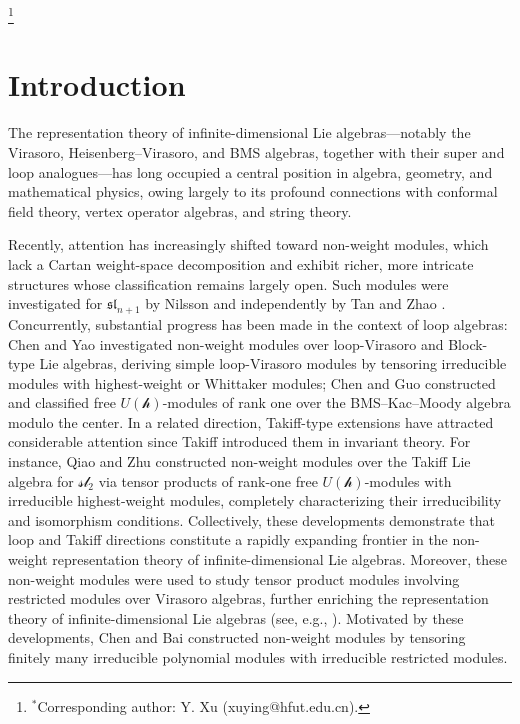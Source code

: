 \documentclass[12pt,reqno]{amsart}
\numberwithin{equation}{section}
\begin{document}
 

\footnote {
$^*$Corresponding author: Y. Xu (xuying@hfut.edu.cn).
}
\maketitle
\vspace{-10mm}


\tableofcontents
\section{Introduction}
The representation theory of infinite-dimensional Lie algebras---notably the Virasoro, Heisenberg--Virasoro, and BMS algebras, together with their super and loop analogues---has long occupied a central position in algebra, geometry, and mathematical physics, owing largely to its profound connections with conformal field theory, vertex operator algebras, and string theory. 

  
Recently, attention has increasingly shifted toward non-weight modules,
 which lack a Cartan weight-space decomposition and exhibit richer, more intricate structures whose classification remains largely open. 
 Such modules were investigated for \(\mathfrak{sl}_{n+1}\) by Nilsson \cite{N1} and independently by Tan and Zhao \cite{TZ1}. Concurrently, substantial progress has been made in the context of loop algebras: Chen and Yao \cite{CY} investigated non-weight modules over loop-Virasoro and Block-type Lie algebras, deriving simple loop-Virasoro modules by tensoring irreducible modules with highest-weight or Whittaker modules; Chen and Guo \cite{CG1} constructed and classified  free \(U(\mathcal{h})\)-modules of rank one over the BMS--Kac--Moody algebra modulo the center.
 In a related direction, Takiff-type extensions have attracted considerable attention since Takiff \cite{T} introduced them in invariant theory. For instance, Qiao and Zhu \cite{QZ} constructed non-weight modules over the Takiff Lie algebra for \(\mathcal{sl}_2\) via tensor products of rank-one free \(U(\mathcal{h})\)-modules with irreducible highest-weight modules, completely characterizing their irreducibility and isomorphism conditions. Collectively, these developments demonstrate that loop and Takiff directions constitute a rapidly expanding frontier in the non-weight representation theory of infinite-dimensional Lie algebras. Moreover, these non-weight modules were used to study tensor product modules involving restricted modules over  Virasoro algebras, further enriching the representation theory of infinite-dimensional Lie algebras (see, e.g., \cite{MZ,TZ2,TZ3}). Motivated by these developments, Chen and Bai \cite{CB} constructed non-weight modules by tensoring finitely many irreducible polynomial   modules with irreducible restricted modules.
\end{document}
